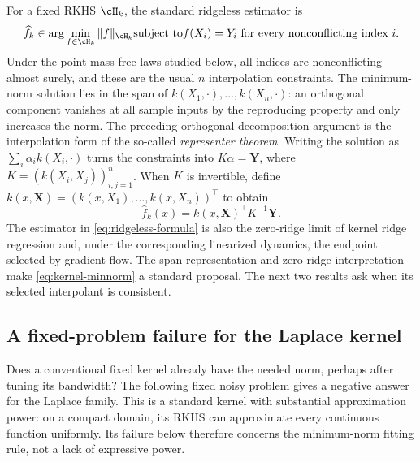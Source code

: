 \documentclass[11pt,twoside]{article}
\theoremstyle{definition}
\theoremstyle{remark}
\begin{document}
For a fixed RKHS $\cH_k$, the standard ridgeless estimator is
\begin{equation}
 \widehat f_k\in\arg\min_{f\in\cH_k}\|f\|_{\cH_k}
 \quad\text{subject to}\quad
 f(X_i)=Y_i\ \text{for every nonconflicting index }i.
 \label{eq:kernel-minnorm}
\end{equation}
Under the point-mass-free laws studied below, all indices are nonconflicting almost
surely, and these are the usual $n$ interpolation constraints.
The minimum-norm solution lies in the span of
$k(X_1,\cdot),\ldots,k(X_n,\cdot)$: an orthogonal component vanishes at all
sample inputs by the reproducing property and only increases the norm.
The preceding orthogonal-decomposition argument is the interpolation form of
the so-called \emph{representer theorem}. Writing the
solution as $\sum_i\alpha_i k(X_i,\cdot)$ turns the constraints into
$K\alpha=\mathbf Y$, where $K=(k(X_i,X_j))_{i,j=1}^n$.
When $K$ is invertible, define
$k(x,\mathbf X)=(k(x,X_1),\ldots,k(x,X_n))^\top$ to obtain
\begin{equation}
 \widehat f_k(x)=k(x,\mathbf X)^\top K^{-1}\mathbf Y.
 \label{eq:ridgeless-formula}
\end{equation}
The estimator in \cref{eq:ridgeless-formula} is also the zero-ridge limit of
kernel ridge regression and, under the corresponding linearized dynamics, the
endpoint selected by gradient flow.
The span representation and zero-ridge interpretation make
\cref{eq:kernel-minnorm} a standard proposal. The next two
results ask when its selected interpolant is consistent.

\subsection{A fixed-problem failure for the Laplace kernel}

Does a conventional fixed kernel already have the needed norm, perhaps after
tuning its bandwidth? The following fixed noisy problem gives a negative
answer for the Laplace family. This is a standard kernel with substantial
approximation power: on a compact domain, its RKHS can approximate every
continuous function uniformly. Its failure below therefore concerns the
minimum-norm fitting rule, not a lack of expressive power.
\end{document}
